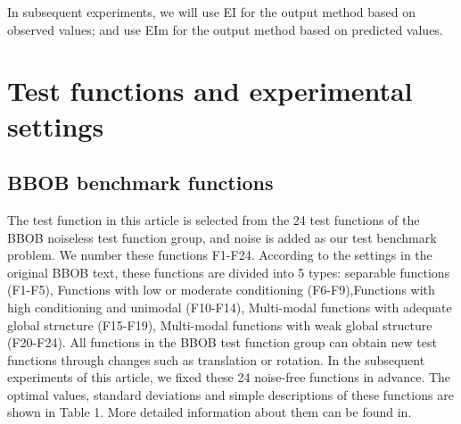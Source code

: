 \documentclass{article}
\begin{document}
\hspace{2em}In subsequent experiments, we will use EI for the output method based on observed values; and use EIm for the output method based on predicted values.

\section{Test functions and experimental settings}
\subsection{BBOB benchmark functions}

\hspace{2em}The test function in this article is selected from the 24 test functions of the BBOB noiseless test function group, and noise is added as our test benchmark problem. We number these functions F1-F24. According to the settings in the original BBOB text, these functions are divided into 5 types: separable functions (F1-F5), Functions with low or moderate conditioning (F6-F9),Functions with high conditioning and unimodal (F10-F14),  Multi-modal functions with adequate global structure (F15-F19), Multi-modal functions with weak global structure (F20-F24). All functions in the BBOB test function group can obtain new test functions through changes such as translation or rotation. In the subsequent experiments of this article, we fixed these 24 noise-free functions in advance. The optimal values, standard deviations and simple descriptions of these functions are shown in Table 1. More detailed information about them can be found in\citep{Hansen2010RealParameterBO}.
\end{document}
